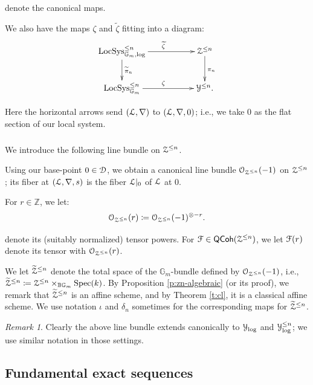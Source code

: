\documentclass[reqno,11pt]{amsart}
\numberwithin{equation}{subsection}
\theoremstyle{remark}
\newtheorem{rem}[thm]{Remark}
\newcommand{\bB}{{\mathbb B}}
\newcommand{\bG}{{\mathbb G}}
\newcommand{\bZ}{{\mathbb Z}}
\newcommand{\sD}{{\EuScript D}}
\newcommand{\sF}{{\EuScript F}}
\newcommand{\sL}{{\EuScript L}}
\newcommand{\sO}{{\EuScript O}}
\newcommand{\sY}{{\EuScript Y}}
\newcommand{\sZ}{{\EuScript Z}}
\newcommand{\on}{\operatorname}
\newcommand{\Spec}{\on{Spec}}
\newcommand{\LocSys}{\on{LocSys}}
\newcommand{\QCoh}{\mathsf{QCoh}}
\begin{document}
\noindent denote the canonical maps. 

We also have the maps $\zeta$ and $\widetilde{\zeta}$ fitting into 
a diagram:
%
\[
\xymatrix{
\LocSys_{\bG_m,\log}^{\leq n} 
\ar[rr]^{\widetilde{\zeta}} \ar[d]^{\widetilde{\pi}_n} 
&& \sZ^{\leq n} 
\ar[d]^{\pi_n} \\
\LocSys_{\bG_m}^{\leq n} \ar[rr]^{\zeta} && \sY^{\leq n}.
}
\]

\noindent Here the horizontal arrows send
$(\sL,\nabla)$ to $(\sL,\nabla,0)$; i.e., we
take $0$ as the flat section of our local system.

\subsubsection{}\label{sss:z-pic}

We introduce the following line bundle on $\sZ^{\leq n}$.

Using our base-point $0 \in \sD$, we obtain a canonical line bundle
$\sO_{\sZ^{\leq n}}(-1)$ on $\sZ^{\leq n}$; its fiber at
$(\sL,\nabla,s)$ is the fiber $\sL|_0$ of $\sL$ at $0$.

For $r \in \bZ$, we let:
%
\[
\sO_{\sZ^{\leq n}}(r) \coloneqq \sO_{\sZ^{\leq n}}(-1)^{\otimes -r}.
\]

\noindent denote its (suitably normalized) tensor powers. 
For $\sF \in \QCoh(\sZ^{\leq n})$, we let
$\sF(r)$ denote its tensor with $\sO_{\sZ^{\leq n}}(r)$.

We let $\widetilde{\sZ}^{\leq n}$ denote the total space of the $\bG_m$-bundle
defined by $\sO_{\sZ^{\leq n}}(-1)$, i.e., 
$\widetilde{\sZ}^{\leq n} \coloneqq \sZ^{\leq n} \times_{\bB \bG_m} \Spec(k)$.
By Proposition \ref{p:zn-algebraic} (or its proof), we remark that
$\widetilde{\sZ}^{\leq n}$ is an affine scheme, and by Theorem \ref{t:cl},
it is a classical affine scheme. We use notation $\iota$ and $\delta_n$
sometimes for the corresponding maps for $\widetilde{\sZ}^{\leq n}$.

\begin{rem}

Clearly the above line bundle extends canonically to $\sY_{\log}$ and
$\sY_{\log}^{\leq n}$; we use similar notation in those settings.

\end{rem}

\subsection{Fundamental exact sequences}\label{ss:fund}
\end{document}
